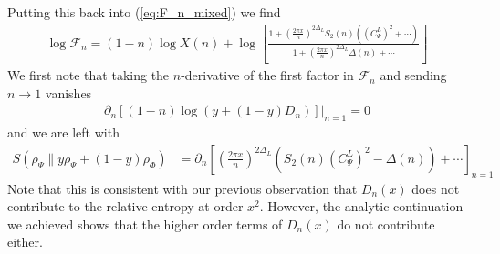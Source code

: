 \documentclass[11pt]{article}
\newcommand{\lb}{\left(}
\newcommand{\rb}{\right)}
\begin{document}
  Putting this back into (\ref{eq:F_n_mixed}) we find
    \begin{align}
    \log\mathcal{F}_{n}=(1-n)\log X(n)+\log\left[\frac{1+\lb \frac{2\pi x}{n}\rb^{2\Delta_L}S_{2}(n)\lb {(C_{\Psi}^L)}^{2}+\cdots\rb}{1+\lb \frac{2\pi x}{n}\rb^{2\Delta_L}\Delta(n)+\cdots}\right]
  \end{align}
  We first note that taking the $n$-derivative of the first factor in $\mathcal{F}
  _{n}$ and sending $n\to 1$ vanishes
  \begin{align}
    \partial_{n}\left[(1-n)\log(y+(1-y)D_{n})\right]\Big|_{n=1}=0
  \end{align}
  and we are left with
  \begin{align}
    S(\rho_\Psi\|y\rho_{\Psi}+(1-y)\rho_{\Phi}) & =\partial_{n}\left[\lb \frac{2\pi x}{n}\rb^{2\Delta_L}\lb S_{2}(n) {(C_\Psi^L)}^{2}-\Delta(n)\rb+\cdots\right]_{n=1}
  \end{align}
Note that this is consistent with our previous observation that $D_n(x)$ does not contribute to the relative entropy at order $x^2$. However, the analytic continuation we achieved shows that the higher order terms of $D_n(x)$ do not contribute either.
\end{document}
